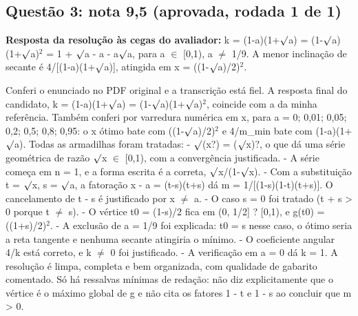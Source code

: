 \documentclass{article}%
\begin{document}
\subsection*{Questão 3: nota 9,5 (aprovada, rodada 1 de 1)}%
\textbf{Resposta da resolução às cegas do avaliador:} k = (1-a)(1+$\surd$a) = (1-$\surd$a)(1+$\surd$a)$^2$ = 1 + $\surd$a - a - a$\surd$a, para a $\in$ {[}0,1), a $\neq$ 1/9. A menor inclinação de secante é 4/{[}(1-a)(1+$\surd$a){]}, atingida em x = ((1-$\surd$a)/2)$^2$.\par %
Conferi o enunciado no PDF original e a transcrição está fiel. A resposta final do candidato, k = (1-a)(1+$\surd$a) = (1-$\surd$a)(1+$\surd$a)$^2$, coincide com a da minha referência. Também conferi por varredura numérica em x, para a = 0; 0,01; 0,05; 0,2; 0,5; 0,8; 0,95: o x ótimo bate com ((1-$\surd$a)/2)$^2$ e 4/m\_min bate com (1-a)(1+$\surd$a).\newline%
\newline%
Todas as armadilhas foram tratadas:\newline%
{-} $\surd$(x?) = ($\surd$x)?, o que dá uma série geométrica de razão $\surd$x $\in$ {[}0,1), com a convergência justificada.\newline%
{-} A série começa em n = 1, e a forma escrita é a correta, $\surd$x/(1-$\surd$x).\newline%
{-} Com a substituição t = $\surd$x, s = $\surd$a, a fatoração x - a = (t-s)(t+s) dá m = 1/{[}(1-s)(1-t)(t+s){]}. O cancelamento de t - s é justificado por x $\neq$ a.\newline%
{-} O caso s = 0 foi tratado (t + s > 0 porque t $\neq$ s).\newline%
{-} O vértice t0 = (1-s)/2 fica em (0, 1/2{]} ? {[}0,1), e g(t0) = ((1+s)/2)$^2$.\newline%
{-} A exclusão de a = 1/9 foi explicada: t0 = s nesse caso, o ótimo seria a reta tangente e nenhuma secante atingiria o mínimo.\newline%
{-} O coeficiente angular 4/k está correto, e k $\neq$ 0 foi justificado.\newline%
{-} A verificação em a = 0 dá k = 1.\newline%
\newline%
A resolução é limpa, completa e bem organizada, com qualidade de gabarito comentado. Só há ressalvas mínimas de redação: não diz explicitamente que o vértice é o máximo global de g e não cita os fatores 1 - t e 1 - s ao concluir que m > 0.%
\end{document}
